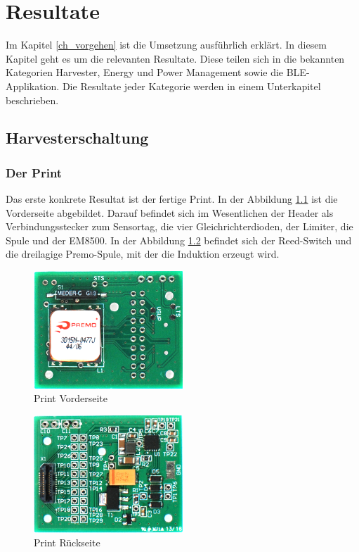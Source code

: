 \chapter{Resultate}
\label{ch_resultat}

Im Kapitel \ref{ch_vorgehen} ist die Umsetzung ausführlich erklärt. In diesem Kapitel geht es um die relevanten Resultate. Diese teilen sich in die bekannten Kategorien Harvester, Energy und Power Management sowie die BLE-Applikation. Die Resultate jeder Kategorie werden in einem Unterkapitel beschrieben.
 
\section{Harvesterschaltung}

\subsection{Der Print}

Das erste konkrete Resultat ist der fertige Print. In der Abbildung \ref{print_vorne} ist die Vorderseite abgebildet.  Darauf befindet sich im Wesentlichen der Header als Verbindungsstecker zum Sensortag, die vier Gleichrichterdioden, der Limiter, die Spule und der EM8500. In der Abbildung \ref{print_rueckseite} befindet sich der Reed-Switch und die dreilagige Premo-Spule, mit der die Induktion erzeugt wird.

\begin{figure}[ht]
    \includegraphics[width=0.5\textwidth]{4Resultate/imag/print_rueckseite.png} 
    \caption{Print Vorderseite}
    \label{print_vorne}
\end{figure}


\begin{figure}[ht]
    \includegraphics[width=0.5\textwidth]{4Resultate/imag/print_vorne.png} 
    \caption{Print Rückseite}
    \label{print_rueckseite}
\end{figure}

